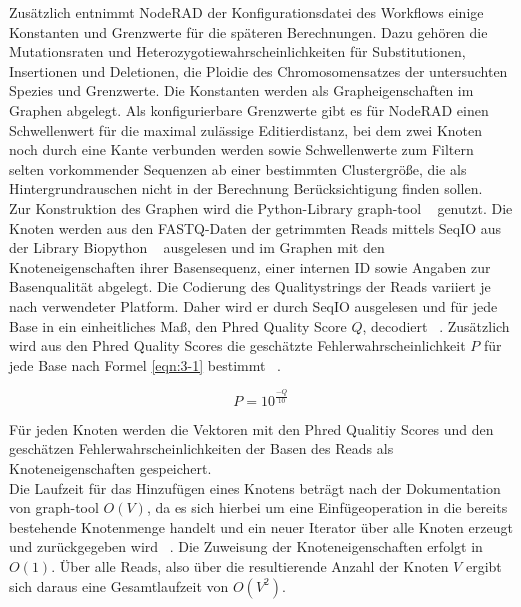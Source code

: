 Zusätzlich entnimmt NodeRAD der Konfigurationsdatei des Workflows einige Konstanten und Grenzwerte für die späteren Berechnungen. Dazu gehören die Mutationsraten und Heterozygotiewahrscheinlichkeiten für Substitutionen, Insertionen und Deletionen, die Ploidie des Chromosomensatzes der untersuchten Spezies und Grenzwerte. Die Konstanten werden als Grapheigenschaften im Graphen abgelegt. Als konfigurierbare Grenzwerte gibt es für NodeRAD einen Schwellenwert für die maximal zulässige Editierdistanz, bei dem zwei Knoten noch durch eine Kante verbunden werden sowie Schwellenwerte zum Filtern selten vorkommender Sequenzen ab einer bestimmten Clustergröße, die als Hintergrundrauschen nicht in der Berechnung Berücksichtigung finden sollen. \\

Zur Konstruktion des Graphen wird die Python-Library graph-tool ~\cite{peixoto_2014} genutzt. Die Knoten werden aus den FASTQ-Daten der getrimmten Reads mittels SeqIO aus der Library Biopython ~\cite{cock_2009_1} ausgelesen und im Graphen mit den Knoteneigenschaften ihrer Basensequenz, einer internen ID sowie Angaben zur Basenqualität abgelegt. Die Codierung des Qualitystrings der Reads variiert je nach verwendeter Platform. Daher wird er durch SeqIO ausgelesen und für jede Base in ein einheitliches Maß, den Phred Quality Score $ Q $, decodiert ~\cite{cock_2009_2}. Zusätzlich wird aus den Phred Quality Scores die geschätzte Fehlerwahrscheinlichkeit $ P $ für jede Base nach Formel \eqref{eqn:3-1} bestimmt ~\cite{ewing_1998}.  

\begin{equation} \label{eqn:3-1}
    \tag{3-1}
    P = 10^{\frac{-Q}{10}}
\end{equation}

Für jeden Knoten werden die Vektoren mit den Phred Qualitiy Scores und den geschätzen Fehlerwahrscheinlichkeiten der Basen des Reads als Knoteneigenschaften gespeichert. \\

Die Laufzeit für das Hinzufügen eines Knotens beträgt nach der Dokumentation von graph-tool  $ O(V) $, da es sich hierbei um eine Einfügeoperation in die bereits bestehende Knotenmenge handelt und ein neuer Iterator über alle Knoten erzeugt und zurückgegeben wird ~\cite{docs_graph_tool}. Die Zuweisung der Knoteneigenschaften erfolgt in $ O(1) $. Über alle Reads, also über die resultierende Anzahl der Knoten $ V $ ergibt sich daraus eine Gesamtlaufzeit von $ O(V^2) $.\\

